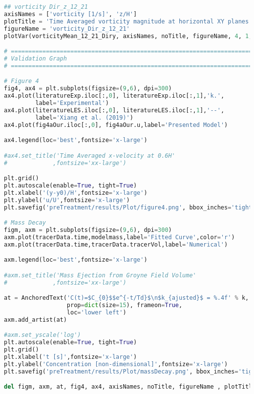 \begin{lstlisting}[language=python]
## vorticity Dir_z_12_21
axisNames = ['vorticity [1/s]', 'z/H']
plotTitle = 'Time Averaged vorticity magnitude at horizontal XY planes'
figureName = 'vorticity_Dir_z_12_21'
plotVar(vorticityMean_12_21_Diry, axisNames, noTitle, figureName, 4, 1, 12, 21)

# =============================================================================
# Validation Graph
# =============================================================================

# Figure 4
fig4, ax4 = plt.subplots(figsize=(9,6), dpi=300)
ax4.plot(literatureExp.iloc[:,0], literatureExp.iloc[:,1],'k.',
         label='Experimental')
ax4.plot(literatureLES.iloc[:,0], literatureLES.iloc[:,1],'--',
         label='Xiang et al. (2019)')
ax4.plot(fig4aOur.iloc[:,0], fig4aOur.u,label='Presented Model')

ax4.legend(loc='best',fontsize='x-large')

#ax4.set_title('Time Averaged x-velocity at 0.6H'
#             ,fontsize='xx-large')

plt.grid()
plt.autoscale(enable=True, tight=True)
plt.xlabel('(y-y0)/H',fontsize='x-large')
plt.ylabel('u/U',fontsize='x-large')
plt.savefig('preTreatment/results/Plot/figure4.png', bbox_inches='tight')

# Mass Decay
figm, axm = plt.subplots(figsize=(9,6), dpi=300)
axm.plot(tracerData.time,modelmass,label='Fitted Curve',color='r')
axm.plot(tracerData.time,tracerData.tracerVol,label='Numerical')

axm.legend(loc='best',fontsize='x-large')

#axm.set_title('Mass Ejection from Groyne Field Volume'
#             ,fontsize='xx-large')

at = AnchoredText('C(t)=$C_{0}$$e^{-t/Td}$\n$k_{ajusted}$ = %.4f' % k,
                  prop=dict(size=15), frameon=True,
                  loc='lower left')
axm.add_artist(at)

#axm.set_yscale('log')
plt.autoscale(enable=True, tight=True)
plt.grid()
plt.xlabel('t [s]',fontsize='x-large')
plt.ylabel('Concentration [non-dimensional]',fontsize='x-large')
plt.savefig('preTreatment/results/Plot/massDecay.png', bbox_inches='tight')

del figm, axm, at, fig4, ax4, axisNames, noTitle, figureName , plotTitle

\end{lstlisting}
